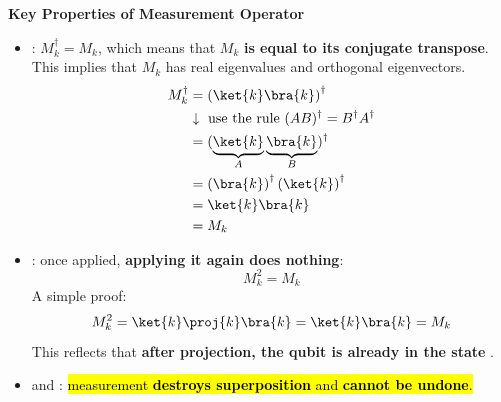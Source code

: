 \highspace
\begin{flushleft}
  \textcolor{Green3}{ \textbf{Key Properties of Measurement Operator}}
\end{flushleft}
\begin{itemize}
  \item {}\label{prop:hermitian} : $M_{k}^{\dagger} = M_{k}$, which means that $M_k$ \textbf{is equal to its conjugate transpose}. This implies that $M_k$ has real eigenvalues and orthogonal eigenvectors.
  \begin{align*}
    M_{k}^{\dagger} &= \left(\ket{k}\bra{k}\right)^{\dagger} \\
    &\downarrow \text{ use the rule } (A B)^{\dagger} = B^{\dagger} A^{\dagger} \\
    &= (\underbrace{\ket{k}}_{A}\underbrace{\bra{k}}_{B})^{\dagger} \\
    &= \left(\bra{k}\right)^{\dagger} \left(\ket{k}\right)^{\dagger} \\
    &= \ket{k}\bra{k} \\
    &= M_{k}
  \end{align*}
  \item {}\label{prop:idempotent} : once applied, \textbf{applying it again does nothing}:
  \begin{equation*}
    M_{k}^{2} = M_{k}
  \end{equation*}
  A simple proof:
  \begin{equation*}
    M_{k}^{2} = \ket{k} \proj{k} \bra{k} = \ket{k}\bra{k} = M_{k}
  \end{equation*}
  This reflects that \textbf{after projection, the qubit is already in the state} .

  \item {} and : \hl{measurement \textbf{destroys superposition} and \textbf{cannot be undone}.}
\end{itemize}